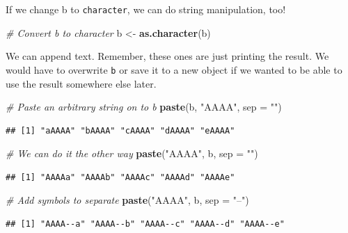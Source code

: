 \documentclass[
]{book}
\newenvironment{Shaded}{\begin{snugshade}}{\end{snugshade}}
\newcommand{\CommentTok}[1]{\textcolor[rgb]{0.56,0.35,0.01}{\textit{#1}}}
\newcommand{\DataTypeTok}[1]{\textcolor[rgb]{0.13,0.29,0.53}{#1}}
\newcommand{\KeywordTok}[1]{\textcolor[rgb]{0.13,0.29,0.53}{\textbf{#1}}}
\newcommand{\NormalTok}[1]{#1}
\newcommand{\StringTok}[1]{\textcolor[rgb]{0.31,0.60,0.02}{#1}}
\begin{document}
If we change b to \texttt{character}, we can do string manipulation, too!

\begin{Shaded}
\begin{Highlighting}[]
\CommentTok{# Convert b to character}
\NormalTok{b <-}\StringTok{ }\KeywordTok{as.character}\NormalTok{(b)}
\end{Highlighting}
\end{Shaded}

We can append text. Remember, these ones are just printing the result. We would have to overwrite \texttt{b} or save it to a new object if we wanted to be able to use the result somewhere else later.

\begin{Shaded}
\begin{Highlighting}[]
\CommentTok{# Paste an arbitrary string on to b}
\KeywordTok{paste}\NormalTok{(b, }\StringTok{"AAAA"}\NormalTok{, }\DataTypeTok{sep =} \StringTok{""}\NormalTok{)}
\end{Highlighting}
\end{Shaded}

\begin{verbatim}
## [1] "aAAAA" "bAAAA" "cAAAA" "dAAAA" "eAAAA"
\end{verbatim}

\begin{Shaded}
\begin{Highlighting}[]
\CommentTok{# We can do it the other way}
\KeywordTok{paste}\NormalTok{(}\StringTok{"AAAA"}\NormalTok{, b, }\DataTypeTok{sep =} \StringTok{""}\NormalTok{)}
\end{Highlighting}
\end{Shaded}

\begin{verbatim}
## [1] "AAAAa" "AAAAb" "AAAAc" "AAAAd" "AAAAe"
\end{verbatim}

\begin{Shaded}
\begin{Highlighting}[]
\CommentTok{# Add symbols to separate}
\KeywordTok{paste}\NormalTok{(}\StringTok{"AAAA"}\NormalTok{, b, }\DataTypeTok{sep =} \StringTok{"--"}\NormalTok{)}
\end{Highlighting}
\end{Shaded}

\begin{verbatim}
## [1] "AAAA--a" "AAAA--b" "AAAA--c" "AAAA--d" "AAAA--e"
\end{verbatim}
\end{document}
